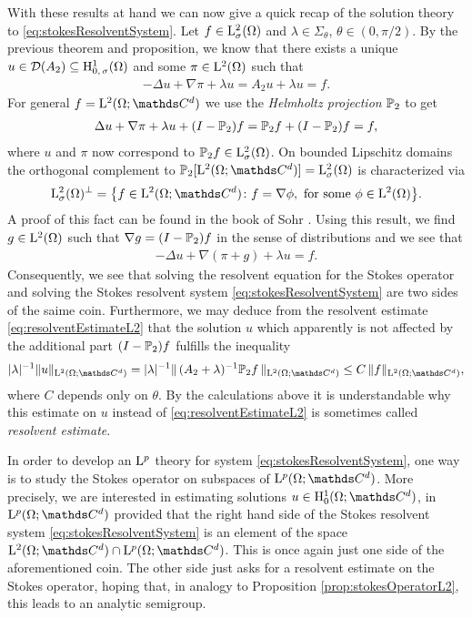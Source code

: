 With these results at hand we can now give a quick recap of the solution theory to \eqref{eq:stokesResolventSystem}.
Let $f \in \mathrm{L}^2_\sigma(\Omega)$ and $\lambda \in \Sigma_\theta$, $\theta \in (0, \pi/2)$.
By the previous theorem and proposition, we know that there exists a unique $u \in \mathcal{D}(A_2) \subseteq \mathrm{H}^1_{0,\,\sigma}(\Omega)$ and some $\pi \in \mathrm{L}^2(\Omega)$ such that
\begin{align*}
  -\Delta u + \nabla \pi + \lambda u = A_2 u + \lambda u = f.
\end{align*}
For general $f = \Ell^2(\Omega; \C^d)$ we use the \emph{Helmholtz projection} $\mathbb{P}_2$ to get
\begin{align*}
  \Delta u + \nabla \pi + \lambda u + (I - \mathbb{P}_2) f = \mathbb{P}_2 f + (I - \mathbb{P}_2) f = f,
\end{align*}
where $u$ and $\pi$ now correspond to $\mathbb{P}_2 f \in \mathrm{L}^2_\sigma(\Omega)$. On bounded Lipschitz domains the orthogonal complement to $\PP_2[\Ell^2(\Omega; \C^d)] = \Ell^2_\sigma(\Omega)$ is characterized via
\begin{align*}
  \Ell^2_\sigma(\Omega)^\perp = \big\{ f \in \Ell^2(\Omega; \C^d) \colon f = \nabla \phi, \text{ for some } \phi \in \Ell^2(\Omega) \big\}.
\end{align*}
A proof of this fact can be found in the book of Sohr \cite[Lem.\@~2.5.3]{sohr}.
Using this result, we find $g \in \mathrm{L}^2(\Omega)$ such that $\nabla g = (I - \mathbb{P}_2)f$ in the sense of distributions and we see that
\begin{align*}
  -\Delta u + \nabla( \pi + g ) + \lambda u = f.
\end{align*}
Consequently, we see that solving the resolvent equation for the Stokes operator and solving the Stokes resolvent system \eqref{eq:stokesResolventSystem} are two sides of the saime coin.
Furthermore, we may deduce from the resolvent estimate \eqref{eq:resolventEstimateL2} that the solution $u$ which apparently is not affected by the additional part $(I-\mathbb{P}_2)f$ fulfills the inequality
\begin{align*}
  |\lambda|^{-1} \| u\|_{\Ell^2(\Omega; \C^d)} 
  = |\lambda|^{-1} \|\,(A_2 + \lambda)^{-1} \PP_2 f \,\|_{\Ell^2(\Omega; \C^d)} 
  \leq C\, \| f \|_{\Ell^2(\Omega; \C^d)},
\end{align*}
where $C$ depends only on $\theta$.
By the calculations above it is understandable why this estimate on $u$ instead of \eqref{eq:resolventEstimateL2} is sometimes called \emph{resolvent estimate}.

In order to develop an $\mathrm{L}^p$ theory for system \eqref{eq:stokesResolventSystem}, one way is to study the Stokes operator on subspaces of $\Ell^p(\Omega; \C^d)$.
More precisely, we are interested in estimating solutions $u \in \HH^1_0(\Omega; \C^d)$, in $\Ell^p(\Omega; \C^d)$ provided that the right hand side of the Stokes resolvent system \eqref{eq:stokesResolventSystem} is an element of the space $\Ell^2(\Omega; \C^d) \cap \Ell^p(\Omega; \C^d)$.
This is once again just one side of the aforementioned coin. 
The other side just asks for a resolvent estimate on the Stokes operator, hoping that, in analogy to Proposition \ref{prop:stokesOperatorL2}, this leads to an analytic semigroup.

